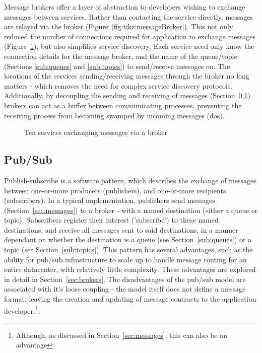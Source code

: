 Message brokers offer a layer of abstraction to developers wishing to exchange
messages between services. Rather than contacting the service directly, messages
are relayed via the broker (Figure~\ref{fig:tikz:messageBroker}). This not only
reduced the number of connections required for application to exchange messages
(Figure~\ref{fig:tikz:complexBrokerMessaging}), but also simplifies service
discovery. Each service need only know the connection details for the message
broker, and the name of the queue/topic (Sections \ref{sub:queues} and
\ref{sub:topics}) to send/receive messages on. The locations of the services
sending/receiving messages through the broker no long matters - which removes
the need for complex service discovery protocols. Additionally, by decoupling
the sending and receiving of messages (Section~\ref{sub:pubsub}) brokers can act
as a buffer between communicating processes, preventing the receiving process
from becoming swamped by incoming messages (\gls{dos}).

\begin{figure}[ht]
  \centering
  
  \caption{Ten services exchanging messages via a broker}
  \label{fig:tikz:complexBrokerMessaging}
\end{figure}

\subsection{Pub/Sub}
\label{sub:pubsub}

Publish-subscribe is a software pattern, which describes the exchange of
messages between one-or-more producers (publishers), and one-or-more recipients
(subscribers). In a typical implementation, publishers send messages
(Section~\ref{sec:messages}) to a broker - with a named destination (either a
queue or topic). Subscribers register their interest ('subscribe') to these
named destinations, and receive all messages sent to said destinations, in a
manner dependant on whether the destination is a queue (see
Section~\ref{sub:queues}) or a topic (see Section~\ref{sub:topics}). This
pattern has several advantages, such as the ability for pub/sub infrastructure
to scale up to handle message routing for an entire datacenter, with relatively
little complexity. These advantages are explored in detail in
Section~\ref{sec:brokers}. The disadvantages of the pub/sub model are associated
with it's loose coupling - the model itself does not define a message format,
leaving the creation and updating of message contracts to the application
developer.\footnote{Although, as discussed in Section~\ref{sec:messages}, this
can also be an advantage}.

